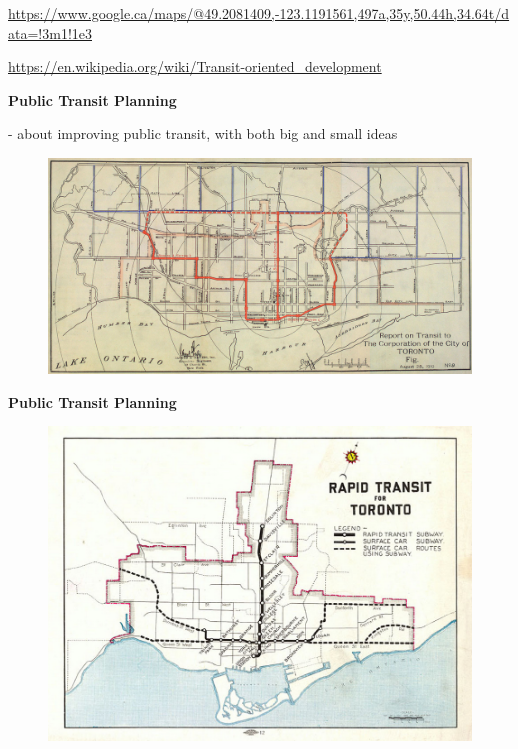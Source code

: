 \documentclass[aspectratio=169]{beamer}
\begin{document}
\begin{frame}
\begin{columns}
\begin{column}{0.5\textwidth}
		\end{column}
		
	\end{columns}

	\vspace{2mm}

	\tiny\url{https://www.google.ca/maps/@49.2081409,-123.1191561,497a,35y,50.44h,34.64t/data=!3m1!1e3}
	
	\tiny\url{https://en.wikipedia.org/wiki/Transit-oriented_development}
	
\end{frame}




\begin{frame}
	
	\textbf{Public Transit Planning}
	
	- about improving public transit, with both big and small ideas

		\begin{figure}
			\centering
			\includegraphics[width=0.9\linewidth]{images/toronto_plan_1910.png}
		\end{figure}
	
	
\end{frame}



\begin{frame}
	
	\textbf{Public Transit Planning}
	

	
	\begin{figure}
		\centering
		\includegraphics[width=0.8\linewidth]{images/toronto_plan_1945.png}
	\end{figure}
	
	
\end{frame}
\end{document}
